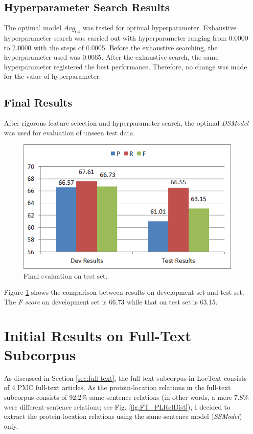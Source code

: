 \subsection{Hyperparameter Search Results}

The optimal model $Avg_{64}$ was tested for optimal hyperparameter. Exhaustive hyperparameter search was carried out with hyperparameter ranging from 0.0000 to 2.0000 with the steps of 0.0005. Before the exhaustive searching, the hyperparameter used was 0.0065. After the exhaustive search, the same hyperparameter registered the best performance. Therefore, no change was made for the value of hyperparameter.

\subsection{Final Results}

After rigorous feature selection and hyperparameter search, the optimal \textit{DSModel} was used for evaluation of unseen test data.

\begin{figure}
\centering
\includegraphics[scale=0.7]{figures/DSFinalResults.png}
\caption{Final evaluation on test set.}\label{fig:DSFinal}
\end{figure}

Figure \ref{fig:DSFinal} shows the comparison between results on development set and test set. The \textit{F score} on development set is 66.73 while that on test set is 63.15.

\section{Initial Results on Full-Text Subcorpus} \label{sec:FTPrimaryRes}

As discussed in Section \ref{sec:full-text}, the full-text subcorpus in LocText consists of 4 PMC \cite{pmc} full-text articles. As the protein-location relations in the full-text subcorpus consists of 92.2\% same-sentence relations (in other words, a mere 7.8\% were different-sentence relations; see Fig. \ref{fig:FT_PLRelDist}), I decided to extract the protein-location relations using the same-sentence model (\textit{SSModel}) only.

